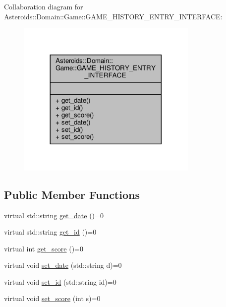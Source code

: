 Collaboration diagram for Asteroids\+:\+:Domain\+:\+:Game\+:\+:G\+A\+M\+E\+\_\+\+H\+I\+S\+T\+O\+R\+Y\+\_\+\+E\+N\+T\+R\+Y\+\_\+\+I\+N\+T\+E\+R\+F\+A\+CE\+:\nopagebreak
\begin{figure}[H]
\begin{center}
\leavevmode
\includegraphics[width=248pt]{classAsteroids_1_1Domain_1_1Game_1_1GAME__HISTORY__ENTRY__INTERFACE__coll__graph}
\end{center}
\end{figure}
\subsection*{Public Member Functions}
\begin{DoxyCompactItemize}
\item 
virtual std\+::string \hyperlink{classAsteroids_1_1Domain_1_1Game_1_1GAME__HISTORY__ENTRY__INTERFACE_a603c07bb9e2da4c245547ba4d33df2f9}{get\+\_\+date} ()=0
\item 
virtual std\+::string \hyperlink{classAsteroids_1_1Domain_1_1Game_1_1GAME__HISTORY__ENTRY__INTERFACE_a39807f3775541e1db7f138769242b72b}{get\+\_\+id} ()=0
\item 
virtual int \hyperlink{classAsteroids_1_1Domain_1_1Game_1_1GAME__HISTORY__ENTRY__INTERFACE_aca7ed35dd716a6621d9faf44822339ae}{get\+\_\+score} ()=0
\item 
virtual void \hyperlink{classAsteroids_1_1Domain_1_1Game_1_1GAME__HISTORY__ENTRY__INTERFACE_a07eaeb99de0c71ed6353a21b513ce43b}{set\+\_\+date} (std\+::string d)=0
\item 
virtual void \hyperlink{classAsteroids_1_1Domain_1_1Game_1_1GAME__HISTORY__ENTRY__INTERFACE_ae87c07141095f1cb3699c378f37cc765}{set\+\_\+id} (std\+::string id)=0
\item 
virtual void \hyperlink{classAsteroids_1_1Domain_1_1Game_1_1GAME__HISTORY__ENTRY__INTERFACE_a23a1106062e67ef19d856f29ee8ade12}{set\+\_\+score} (int s)=0
\end{DoxyCompactItemize}


